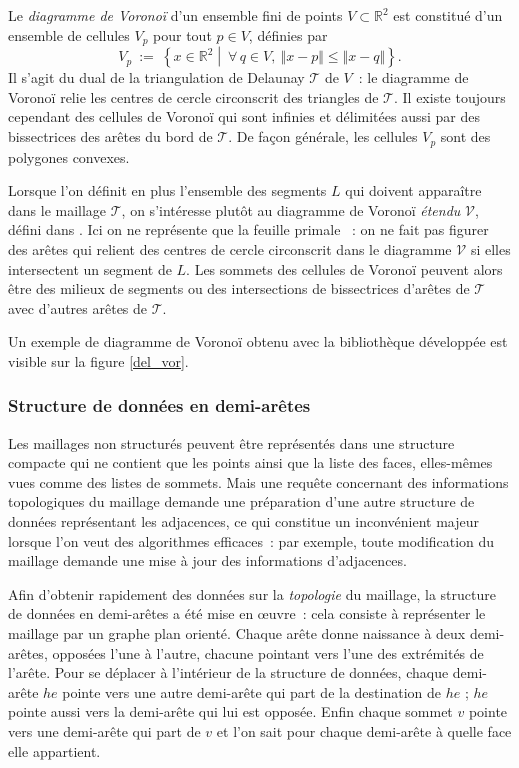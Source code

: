 \documentclass[12pt,a4paper]{report}
\begin{document}
Le \emph{diagramme de Voronoï} d'un ensemble fini de points $V\subset\mathbb{R}^2$ est constitué d'un ensemble de cellules $V_p$ pour tout $p\in V$, définies par
\[V_p\ :=\ \left\{x\in\mathbb{R}^2\middle\vert\ \forall\,q\in V,\ \Vert x-p\Vert\leqslant\Vert x-q\Vert\right\}\text{.}\]
Il s'agit du dual de la triangulation de Delaunay $\mathcal{T}$ de $V$~: le diagramme de Voronoï relie les centres de cercle circonscrit des triangles de $\mathcal{T}$. Il existe toujours cependant des cellules de Voronoï qui sont infinies et délimitées aussi par des bissectrices des arêtes du bord de $\mathcal{T}$. De façon générale, les cellules $V_p$ sont des polygones convexes.

Lorsque l'on définit en plus l'ensemble des segments $L$ qui doivent apparaître dans le maillage $\mathcal{T}$, on s'intéresse plutôt au diagramme de Voronoï \emph{étendu} $\mathcal{V}$, défini dans \cite[pages 30-31]{Edelsbrunner}. Ici on ne représente que la \og feuille primale \fg{}~: on ne fait pas figurer des arêtes qui relient des centres de cercle circonscrit dans le diagramme $\mathcal{V}$ si elles intersectent un segment de $L$. Les sommets des cellules de Voronoï peuvent alors être des milieux de segments ou des intersections de bissectrices d'arêtes de $\mathcal{T}$ avec d'autres arêtes de $\mathcal{T}$.

Un exemple de diagramme de Voronoï obtenu avec la bibliothèque développée est visible sur la figure \ref{del_vor}.


\subsubsection{Structure de données en demi-arêtes}

Les maillages non structurés peuvent être représentés dans une structure compacte qui ne contient que les points ainsi que la liste des faces, elles-mêmes vues comme des listes de sommets. Mais une requête concernant des informations topologiques du maillage demande une préparation d'une autre structure de données représentant les adjacences, ce qui constitue un inconvénient majeur lorsque l'on veut des algorithmes efficaces~: par exemple, toute modification du maillage demande une mise à jour des informations d'adjacences.

Afin d'obtenir rapidement des données sur la \emph{topologie} du maillage, la structure de données en demi-arêtes a été mise en \oe{}uvre~: cela consiste à représenter le maillage par un graphe plan orienté. Chaque arête donne naissance à deux demi-arêtes, opposées l'une à l'autre, chacune pointant vers l'une des extrémités de l'arête. Pour se déplacer à l'intérieur de la structure de données, chaque demi-arête $he$ pointe vers une autre demi-arête qui part de la destination de $he$ ; $he$ pointe aussi vers la demi-arête qui lui est opposée. Enfin chaque sommet $v$ pointe vers une demi-arête qui part de $v$ et l'on sait pour chaque demi-arête à quelle face elle appartient.
\end{document}
